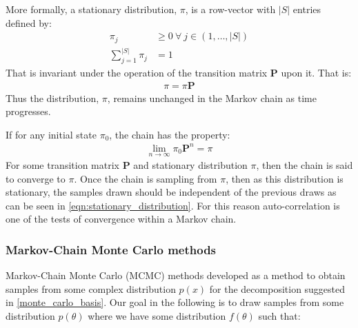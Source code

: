 \documentclass[12pt]{article} %
\begin{document}
More formally, a stationary distribution, $\pi$, is a row-vector with $|S|$ entries defined by:
\begin{align}
\pi_j &\geq 0 \: \forall \: j \in (1,\ldots,|S|) \\
\sum_{j=1}^{|S|}\pi_j &= 1
\end{align}
That is invariant under the operation of the transition matrix $\mathbf{P}$ upon it. That is:
\begin{align} \label{eqn:stationary_distribution}
\pi = \pi\mathbf{P}
\end{align}
Thus the distribution, $\pi$, remains unchanged in the Markov chain as time progresses.

If for any initial state $\pi_0$, the chain has the property:
\begin{align}
\lim_{n\to\infty} \pi_0 \mathbf{P}^n = \pi
\end{align}
For some transition matrix $\mathbf{P}$ and stationary distribution $\pi$, then the chain is said to converge to $\pi$. Once the chain is sampling from $\pi$, then as this distribution is stationary, the samples drawn should be independent of the previous draws as can be seen in \eqref{eqn:stationary_distribution}. For this reason auto-correlation is one of the tests of convergence within a Markov chain.


\subsubsection{Markov-Chain Monte Carlo methods}
Markov-Chain Monte Carlo (MCMC) methods developed as a method to obtain samples from some complex distribution $p(x)$ for the decomposition suggested in \eqref{monte_carlo_basis}. Our goal in the following is to draw samples from some distribution $p(\theta)$ where we have some distribution $f(\theta)$ such that:
\end{document}
